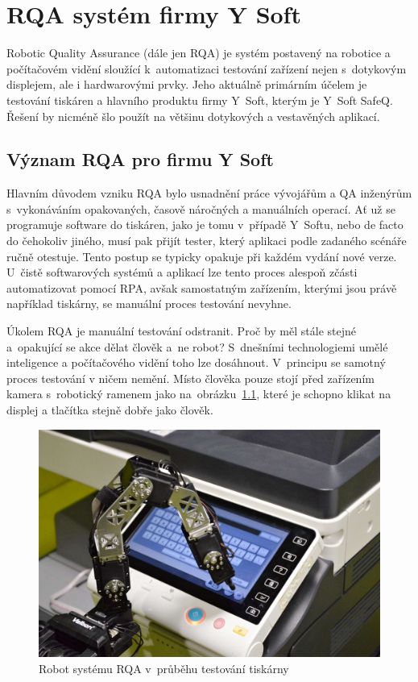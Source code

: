 \chapter{RQA systém firmy Y Soft}
\label{rqa}

Robotic Quality Assurance (dále jen RQA) je systém postavený na robotice a počítačovém vidění sloužící k~automatizaci testování zařízení nejen s~dotykovým displejem, ale i hardwarovými prvky. Jeho aktuálně primárním účelem je testování tiskáren a hlavního produktu firmy Y~Soft, kterým je Y~Soft SafeQ. Řešení by nicméně šlo použít na většinu dotykových a vestavěných aplikací.

\section{Význam RQA pro firmu Y Soft}
Hlavním důvodem vzniku RQA bylo usnadnění práce vývojářům a QA inženýrům s~vykonáváním opakovaných, časově náročných a manuálních operací. Ať už se programuje software do tiskáren, jako je tomu v~případě Y~Softu, nebo de facto do čehokoliv jiného, musí pak přijít tester, který aplikaci podle zadaného scénáře ručně otestuje. Tento postup se typicky opakuje při každém vydání nové verze. U~čistě softwarových systémů a aplikací lze tento proces alespoň zčásti automatizovat pomocí RPA, avšak samostatným zařízením, kterými jsou právě například tiskárny, se manuální proces testování nevyhne.

Úkolem RQA je manuální testování odstranit. Proč by měl stále stejné a~opakující se akce dělat člověk a~ne robot? S~dnešními technologiemi umělé inteligence a počítačového vidění toho lze dosáhnout. V~principu se samotný proces testování v ničem nemění. Místo člověka pouze stojí před zařízením kamera s~robotický ramenem jako na~obrázku~\ref{robot-img}, které je schopno klikat na displej a tlačítka stejně dobře jako člověk.

\begin{figure}[hbt]
	\centering
	\includegraphics[width=1\textwidth]{obrazky/robot.png}
	\caption{Robot systému RQA v~průběhu testování tiskárny}
	\label{robot-img}
\end{figure}

